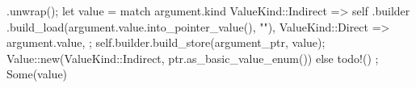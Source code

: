 \documentclass[
  oneside,
  english,
  coorientadorbanca,
  noabntexcite
]{ufsc-thesis-rn46-2019}
\begin{document}
\begin{rustcode}
{{{{{{{{{                                        .unwrap();
                                    let value = match argument.kind {
                                        ValueKind::Indirect => self
                                            .builder
                                            .build_load(argument.value.into_pointer_value(), ""),
                                        ValueKind::Direct => argument.value,
                                    };
                                    self.builder.build_store(argument_ptr, value);
                                }
                                Value::new(ValueKind::Indirect, ptr.as_basic_value_enum())
                            }
                        } else {
                            todo!()
                        };
                        Some(value)
                    }
                }
            }
        }
    }

}
\end{rustcode}
\end{document}
